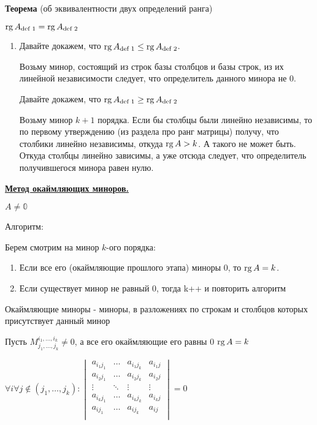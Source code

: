 \textbf{Теорема} (об эквивалентности двух определений ранга)

\( \operatorname{rg} A_{\text{def 1}} = \operatorname{rg} A_{\text{def 2}}\)

\begin{enumerate}
    \item[]\prooff{} Давайте докажем, что \( \operatorname{rg} A_{\text{def 1}} \leq \operatorname{rg} A_{\text{def 2}}\).

          Возьму минор, состоящий из строк базы столбцов и базы строк, из их линейной независимости следует, что определитель данного минора не 0.


          Давайте докажем, что \( \operatorname{rg} A_{\text{def 1}} \geq \operatorname{rg} A_{\text{def 2}}\)

          Возьму минор $k+1$ порядка. Если бы столбцы были линейно независимы, то по первому утверждению (из раздела про ранг матрицы) получу, что столбики линейно независимы, откуда $\operatorname{rg} A > k$. А такого не может быть. Откуда столбцы линейно зависимы, а уже отсюда следует, что определитель получившегося минора равен нулю.

\end{enumerate}



\uline{\textbf{Метод окаймляющих миноров.}}

\(A \neq \mathbb{0}\)

Алгоритм:

Берем смотрим на минор \(k\)-ого порядка:
\begin{enumerate}
    \item Если все его (окаймляющие прошлого этапа) миноры 0, то \(\operatorname{rg} A = k\).
    \item Если существует минор не равный 0, тогда k++ и повторить алгоритм
\end{enumerate}

Окаймляющие миноры - миноры, в разложениях по строкам и столбцов которых присутствует данный минор

Пусть \(M_{j_1, \ldots, j_k}^{i_1, \ldots, i_k} \neq 0\), а все его окаймляющие его равны 0 \(\operatorname{rg} A = k\)

\(\forall i \forall j \notin(j_1,
\ldots, j_k):
\begin{vmatrix}
    a_{i_1 j_1} & \ldots & a_{i_1 j_k} & a_{i_1 j} \\
    a_{i_2 j_1} & \ldots & a_{i_2 j_k} & a_{i_2 j} \\
    \vdots      & \ddots & \vdots      & \vdots    \\
    a_{i_k j_1} & \ldots & a_{i_k j_k} & a_{i_k j} \\
    a_{i j_1}   & \ldots & a_{i j_k}   & a_{i j}   \\
\end{vmatrix} = 0\)

